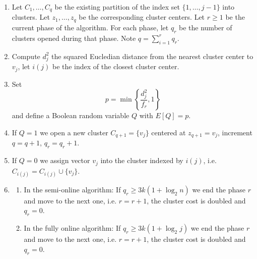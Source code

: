 \documentclass[11pt,twoside]{article}
\begin{document}
\begin{enumerate}
\item Let $C_1,\dots, C_q$ be the existing partition of the index set $\{1,\dots,j-1\}$ into clusters. Let $z_1,\dots,z_q$ be the corresponding cluster centers. Let $r\ge 1$ be the current phase of the algorithm. For each phase, let $q_r$ be the number of clusters opened during that phase. Note $q=\sum_{i=1}^rq_r$.
\item Compute $d^2_j$ the squared Eucledian distance from the nearest cluster center to $v_j$, let $i(j)$ be the index of  the closest cluster center. 
\item  Set
$$p=\min \left\{\frac{d^2_j}{f_r},1\right\}$$ and define a Boolean random variable $Q$ with $E[Q]=p$.
\item If $Q=1$ we  open a new cluster $C_{q+1}=\{v_j\}$ centered at $z_{q+1}=v_j$, increment $q=q+1$, $q_r=q_r+1$.  
\item If $Q=0$ we assign vector $v_j$ into the cluster indexed by $i(j)$, i.e. $C_{i(j)}=C_{i(j)}\cup \{v_j\}$.
\item 
\begin{enumerate}
\item In the semi-online algorithm: If $q_r\ge 3 k (1+ \log_2 n)$  we end the phase $r$ and move to the next one, i.e. $r=r+1$, the cluster cost is doubled and $q_{r}=0$.
\item In the fully online algorithm: If $q_r\ge 3 k(1+  \log_2 j)$  we end the phase $r$ and move to the next one, i.e. $r=r+1$, the cluster cost is doubled and $q_{r}=0$.
\end{enumerate}
\end{enumerate}
\end{document}

